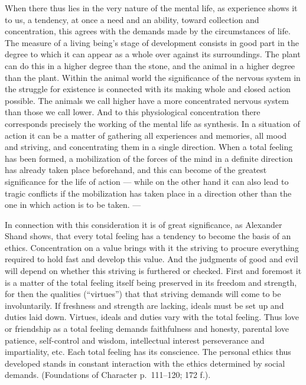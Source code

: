 \documentclass[12pt]{book}
\newcommand{\opage}[1]{\marginnote{\footnotesize\textit{[#1]}}}
\begin{document}
When there thus lies in the very nature of the mental life, as experience shows
it to us, a tendency, at once a need and an ability, toward collection and
concentration, this agrees with the demands made by the circumstances of life.
The measure of a living being's stage of development consists in good part in the
degree to which it can appear as a whole over against its surroundings. The plant
can do this in a higher degree than the stone, and the animal in a higher degree
than the plant. Within the animal world the significance of the nervous system in
the struggle for existence is connected with its making whole and closed action
possible. The animals we call higher have a more concentrated nervous system than
those we call lower. And to this physiological concentration there corresponds
precisely the working of the mental life as synthesis. In a situation of action it
can be a matter of gathering all experiences and memories, all mood and striving,
and concentrating them in a single direction. When a total feeling has been
formed, a mobilization of the forces of the mind in a definite direction has
already taken place beforehand, and this can become of the greatest significance
for the life of action --- while on the other hand it \opage{36}can also lead to
tragic conflicts if the mobilization has taken place in a direction other than
the one in which action is to be taken. ---

In connection with this consideration it is of great significance, as Alexander
Shand shows, that every total feeling has a tendency to become the basis of an
ethics. Concentration on a value brings with it the striving to procure
everything required to hold fast and develop this value. And the judgments of good
and evil will depend on whether this striving is furthered or checked. First and
foremost it is a matter of the total feeling itself being preserved in its
freedom and strength, for then the qualities (``virtues'') that that striving
demands will come to be involuntarily. If freshness and strength are lacking,
ideals must be set up and duties laid down. Virtues, ideals and duties vary with
the total feeling. Thus love or friendship as a total feeling demands
faithfulness and honesty, parental love patience, self-control and wisdom,
intellectual interest perseverance and impartiality, etc. Each total feeling has
its conscience. The personal ethics thus developed stands in constant interaction
with the ethics determined by social demands. (Foundations of Character
p.~111--120; 172 f.).
\end{document}
